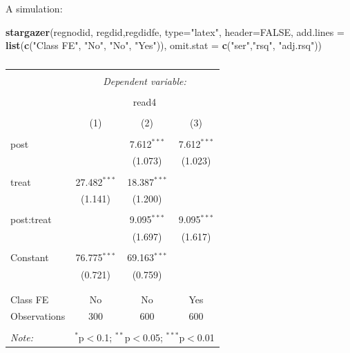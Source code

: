 \documentclass[
  ignorenonframetext,
]{beamer}
\newenvironment{Shaded}{\begin{snugshade}}{\end{snugshade}}
\newcommand{\AttributeTok}[1]{\textcolor[rgb]{0.13,0.29,0.53}{#1}}
\newcommand{\ConstantTok}[1]{\textcolor[rgb]{0.56,0.35,0.01}{#1}}
\newcommand{\FunctionTok}[1]{\textcolor[rgb]{0.13,0.29,0.53}{\textbf{#1}}}
\newcommand{\NormalTok}[1]{#1}
\newcommand{\StringTok}[1]{\textcolor[rgb]{0.31,0.60,0.02}{#1}}
\begin{document}
\begin{frame}[fragile]{A simulation:}
\protect\hypertarget{a-simulation-4}{}
\tiny

\begin{Shaded}
\begin{Highlighting}[]
\FunctionTok{stargazer}\NormalTok{(regnodid, regdid,regdidfe, }\AttributeTok{type=}\StringTok{"latex"}\NormalTok{, }\AttributeTok{header=}\ConstantTok{FALSE}\NormalTok{, }
          \AttributeTok{add.lines =} \FunctionTok{list}\NormalTok{(}\FunctionTok{c}\NormalTok{(}\StringTok{"Class FE"}\NormalTok{, }\StringTok{"No"}\NormalTok{, }\StringTok{"No"}\NormalTok{, }\StringTok{"Yes"}\NormalTok{)), }\AttributeTok{omit.stat =} \FunctionTok{c}\NormalTok{(}\StringTok{"ser"}\NormalTok{,}\StringTok{"rsq"}\NormalTok{, }\StringTok{"adj.rsq"}\NormalTok{))}
\end{Highlighting}
\end{Shaded}

\begin{table}[!htbp] \centering 
  \caption{} 
  \label{} 
\begin{tabular}{@{\extracolsep{5pt}}lccc} 
\\[-1.8ex]\hline 
\hline \\[-1.8ex] 
 & \multicolumn{3}{c}{\textit{Dependent variable:}} \\ 
\cline{2-4} 
\\[-1.8ex] & \multicolumn{3}{c}{read4} \\ 
\\[-1.8ex] & (1) & (2) & (3)\\ 
\hline \\[-1.8ex] 
 post &  & 7.612$^{***}$ & 7.612$^{***}$ \\ 
  &  & (1.073) & (1.023) \\ 
  & & & \\ 
 treat & 27.482$^{***}$ & 18.387$^{***}$ &  \\ 
  & (1.141) & (1.200) &  \\ 
  & & & \\ 
 post:treat &  & 9.095$^{***}$ & 9.095$^{***}$ \\ 
  &  & (1.697) & (1.617) \\ 
  & & & \\ 
 Constant & 76.775$^{***}$ & 69.163$^{***}$ &  \\ 
  & (0.721) & (0.759) &  \\ 
  & & & \\ 
\hline \\[-1.8ex] 
Class FE & No & No & Yes \\ 
Observations & 300 & 600 & 600 \\ 
\hline 
\hline \\[-1.8ex] 
\textit{Note:}  & \multicolumn{3}{r}{$^{*}$p$<$0.1; $^{**}$p$<$0.05; $^{***}$p$<$0.01} \\ 
\end{tabular} 
\end{table}
\end{frame}
\end{document}
